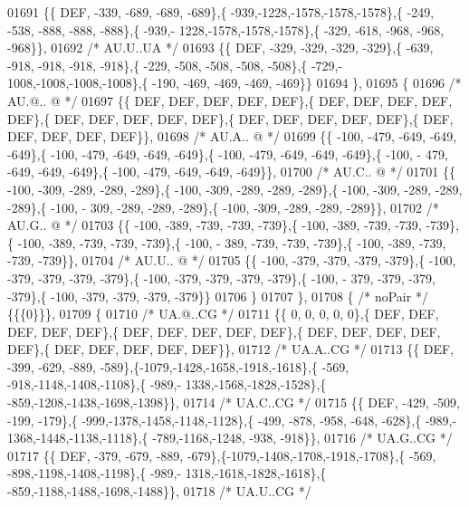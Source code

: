 \begin{DoxyCode}
01691 \{\{  DEF, -339, -689, -689, -689\},\{ -939,-1228,-1578,-1578,-1578\},\{ -249, -538, -888, -888, -888\},\{ -939,-
      1228,-1578,-1578,-1578\},\{ -329, -618, -968, -968, -968\}\},
01692 \textcolor{comment}{/* AU.U..UA */}
01693 \{\{  DEF, -329, -329, -329, -329\},\{ -639, -918, -918, -918, -918\},\{ -229, -508, -508, -508, -508\},\{ -729,-
      1008,-1008,-1008,-1008\},\{ -190, -469, -469, -469, -469\}\}
01694 \},
01695 \{
01696 \textcolor{comment}{/* AU.@.. @ */}
01697 \{\{  DEF,  DEF,  DEF,  DEF,  DEF\},\{  DEF,  DEF,  DEF,  DEF,  DEF\},\{  DEF,  DEF,  DEF,  DEF,  DEF\},\{  DEF,  
      DEF,  DEF,  DEF,  DEF\},\{  DEF,  DEF,  DEF,  DEF,  DEF\}\},
01698 \textcolor{comment}{/* AU.A.. @ */}
01699 \{\{ -100, -479, -649, -649, -649\},\{ -100, -479, -649, -649, -649\},\{ -100, -479, -649, -649, -649\},\{ -100, -
      479, -649, -649, -649\},\{ -100, -479, -649, -649, -649\}\},
01700 \textcolor{comment}{/* AU.C.. @ */}
01701 \{\{ -100, -309, -289, -289, -289\},\{ -100, -309, -289, -289, -289\},\{ -100, -309, -289, -289, -289\},\{ -100, -
      309, -289, -289, -289\},\{ -100, -309, -289, -289, -289\}\},
01702 \textcolor{comment}{/* AU.G.. @ */}
01703 \{\{ -100, -389, -739, -739, -739\},\{ -100, -389, -739, -739, -739\},\{ -100, -389, -739, -739, -739\},\{ -100, -
      389, -739, -739, -739\},\{ -100, -389, -739, -739, -739\}\},
01704 \textcolor{comment}{/* AU.U.. @ */}
01705 \{\{ -100, -379, -379, -379, -379\},\{ -100, -379, -379, -379, -379\},\{ -100, -379, -379, -379, -379\},\{ -100, -
      379, -379, -379, -379\},\{ -100, -379, -379, -379, -379\}\}
01706 \}
01707 \},
01708 \{ \textcolor{comment}{/* noPair */} \{\{\{0\}\}\},
01709 \{
01710 \textcolor{comment}{/* UA.@..CG */}
01711 \{\{    0,    0,    0,    0,    0\},\{  DEF,  DEF,  DEF,  DEF,  DEF\},\{  DEF,  DEF,  DEF,  DEF,  DEF\},\{  DEF,  
      DEF,  DEF,  DEF,  DEF\},\{  DEF,  DEF,  DEF,  DEF,  DEF\}\},
01712 \textcolor{comment}{/* UA.A..CG */}
01713 \{\{  DEF, -399, -629, -889, -589\},\{-1079,-1428,-1658,-1918,-1618\},\{ -569, -918,-1148,-1408,-1108\},\{ -989,-
      1338,-1568,-1828,-1528\},\{ -859,-1208,-1438,-1698,-1398\}\},
01714 \textcolor{comment}{/* UA.C..CG */}
01715 \{\{  DEF, -429, -509, -199, -179\},\{ -999,-1378,-1458,-1148,-1128\},\{ -499, -878, -958, -648, -628\},\{ -989,-
      1368,-1448,-1138,-1118\},\{ -789,-1168,-1248, -938, -918\}\},
01716 \textcolor{comment}{/* UA.G..CG */}
01717 \{\{  DEF, -379, -679, -889, -679\},\{-1079,-1408,-1708,-1918,-1708\},\{ -569, -898,-1198,-1408,-1198\},\{ -989,-
      1318,-1618,-1828,-1618\},\{ -859,-1188,-1488,-1698,-1488\}\},
01718 \textcolor{comment}{/* UA.U..CG */}

\end{DoxyCode}

